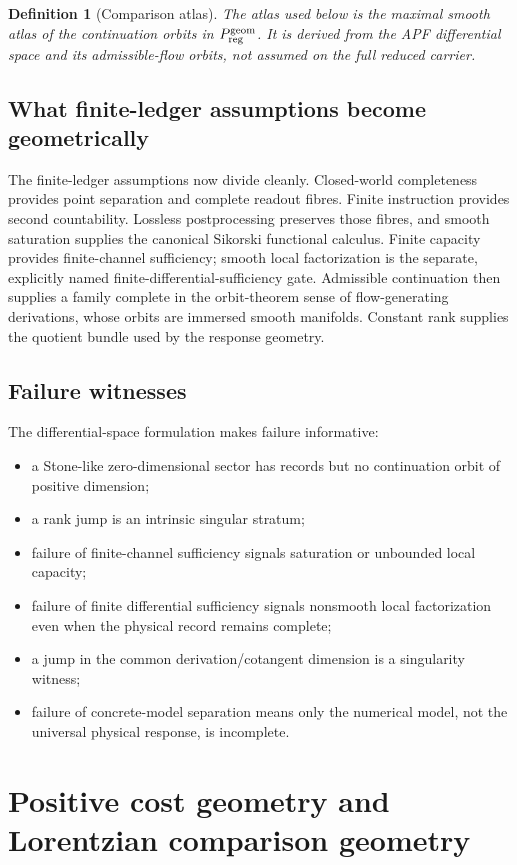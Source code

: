 \documentclass[11pt]{article}
\newtheorem{definition}[theorem]{Definition}
\theoremstyle{remark}
\begin{document}
\begin{definition}[Comparison atlas]
The atlas used below is the maximal smooth atlas of the continuation orbits in
$P^{\rm geom}_{\rm reg}$.  It is derived from the APF differential space and
its admissible-flow orbits, not assumed on the full reduced carrier.
\end{definition}

\subsection{What finite-ledger assumptions become geometrically}
The finite-ledger assumptions now divide cleanly.  Closed-world completeness
provides point separation and complete readout fibres.  Finite instruction
provides second countability.  Lossless postprocessing preserves those fibres,
and smooth saturation supplies the canonical Sikorski functional calculus.
Finite capacity provides finite-channel sufficiency; smooth local factorization
is the separate, explicitly named finite-differential-sufficiency gate.
Admissible continuation then supplies a family complete in the orbit-theorem sense of
flow-generating derivations, whose orbits are immersed smooth manifolds.
Constant rank supplies the quotient bundle used by the response geometry.

\subsection{Failure witnesses}
The differential-space formulation makes failure informative:
\begin{itemize}
\item a Stone-like zero-dimensional sector has records but no continuation
orbit of positive dimension;
\item a rank jump is an intrinsic singular stratum;
\item failure of finite-channel sufficiency signals saturation or unbounded
local capacity;
\item failure of finite differential sufficiency signals nonsmooth local
factorization even when the physical record remains complete;
\item a jump in the common derivation/cotangent dimension is a singularity
witness;
\item failure of concrete-model separation means only the numerical model, not
the universal physical response, is incomplete.
\end{itemize}

\section{Positive cost geometry and Lorentzian comparison geometry}
\label{sec:signature}
\end{document}
